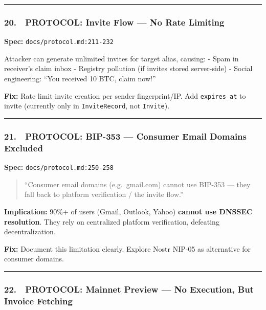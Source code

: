 \documentclass[
]{article}
\begin{document}
\begin{center}\rule{0.5\linewidth}{0.5pt}\end{center}

\hypertarget{protocol-invite-flow-no-rate-limiting}{%
\subsubsection{20. 🔵 PROTOCOL: Invite Flow --- No Rate
Limiting}\label{protocol-invite-flow-no-rate-limiting}}

\textbf{Spec:} \texttt{docs/protocol.md:211-232}

Attacker can generate unlimited invites for target alias, causing: -
Spam in receiver's claim inbox - Registry pollution (if invites stored
server-side) - Social engineering: ``You received 10 BTC, claim now!''

\textbf{Fix:} Rate limit invite creation per sender fingerprint/IP. Add
\texttt{expires\_at} to invite (currently only in \texttt{InviteRecord},
not \texttt{Invite}).

\begin{center}\rule{0.5\linewidth}{0.5pt}\end{center}

\hypertarget{protocol-bip-353-consumer-email-domains-excluded}{%
\subsubsection{21. 🔵 PROTOCOL: BIP-353 --- Consumer Email Domains
Excluded}\label{protocol-bip-353-consumer-email-domains-excluded}}

\textbf{Spec:} \texttt{docs/protocol.md:250-258}

\begin{quote}
``Consumer email domains (e.g.~gmail.com) cannot use BIP-353 --- they
fall back to platform verification / the invite flow.''
\end{quote}

\textbf{Implication:} 90\%+ of users (Gmail, Outlook, Yahoo)
\textbf{cannot use DNSSEC resolution}. They rely on centralized platform
verification, defeating decentralization.

\textbf{Fix:} Document this limitation clearly. Explore Nostr NIP-05 as
alternative for consumer domains.

\begin{center}\rule{0.5\linewidth}{0.5pt}\end{center}

\hypertarget{protocol-mainnet-preview-no-execution-but-invoice-fetching}{%
\subsubsection{22. 🔵 PROTOCOL: Mainnet Preview --- No Execution, But
Invoice
Fetching}\label{protocol-mainnet-preview-no-execution-but-invoice-fetching}}
\end{document}
